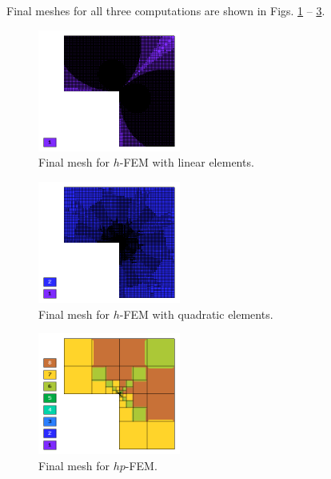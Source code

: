 \documentclass[final,3p,times,twocolumn]{elsarticle}
\begin{document}
Final meshes for all three computations are shown in
Figs. \ref{fig:smooth-iso-4} -- \ref{fig:smooth-iso-2}.
\newpage


\begin{figure}[!ht]
\begin{center}
\includegraphics[height=4cm]{lshape-h1.png}
\end{center}
\vspace{-5.5mm}
\caption{Final mesh for $h$-FEM with linear elements.}
\label{fig:smooth-iso-4}
\vspace{-4mm}
\end{figure}

\begin{figure}[!ht]
\begin{center}
\includegraphics[height=4cm]{lshape-h2.png}
\end{center}
\vspace{-5.5mm}
\caption{Final mesh for $h$-FEM with quadratic elements.}
\label{fig:smooth-iso-3}
\vspace{-4mm}
\end{figure}

\begin{figure}[!ht]
\begin{center}
\includegraphics[height=4cm]{lshape-hp.png}
\end{center}
\vspace{-4mm}
\caption{Final mesh for $hp$-FEM.}
\label{fig:smooth-iso-2}
\end{figure}
\end{document}
